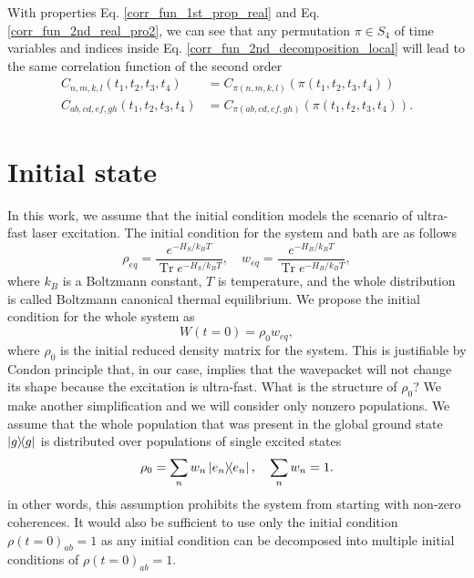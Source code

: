 With properties Eq. \ref{corr_fun_1st_prop_real} and Eq. \ref{corr_fun_2nd_real_pro2}, we can see that any permutation $\pi \in S_4$ of time variables and indices inside Eq. \ref{corr_fun_2nd_decomposition_local} will lead to the same correlation function of the second order 
\begin{equation}
\label{corr_fun_2nd_real_prop3}
    \begin{aligned}
    C_{n,m,k,l}(t_1, t_2, t_3, t_4) &= C_{\pi(n,m,k,l)}(\pi(t_1, t_2, t_3, t_4)) \\
    C_{ab,cd,ef,gh}(t_1, t_2, t_3, t_4) &= C_{\pi(ab,cd,ef,gh)}(\pi(t_1, t_2, t_3, t_4)).
    \end{aligned}
\end{equation}

\section{Initial state}
\label{Initial state}

In this work, we assume that the initial condition models the scenario of ultra-fast laser excitation. The initial condition for the system and bath are as follows
\begin{equation}
    \rho_{eq} = \frac{e^{-H_S / k_BT}}{\operatorname{Tr} e^{-H_S / k_BT}}, \quad w_{eq} = \frac{e^{-H_B / k_BT}}{\operatorname{Tr} e^{-H_B / k_BT}},
\end{equation}
where $k_B$ is a Boltzmann constant, $T$ is temperature, and the whole distribution is called Boltzmann canonical thermal equilibrium. We propose the initial condition for the whole system as
\begin{equation}
    W(t=0) = \rho_0 w_{eq},
\end{equation}
where $\rho_0$ is the initial reduced density matrix for the system. This is justifiable by Condon principle that, in our case, implies that the wavepacket will not change its shape because the excitation is ultra-fast. What is the structure of $\rho_0$? We make another simplification and we will consider only nonzero populations. We assume that the whole population that was present in the global ground state $\ketbra{g}$ is distributed over populations of single excited states
\begin{equation}
    \rho_0 = \sum_n w_n \ketbra{e_n}, \quad \sum_n w_n = 1.
\end{equation}
in other words, this assumption prohibits the system from starting with non-zero coherences. It would also be sufficient to use only the initial condition $\rho(t=0)_{ab}=1$ as any initial condition can be decomposed into multiple initial conditions of $\rho(t=0)_{ab}=1$.

